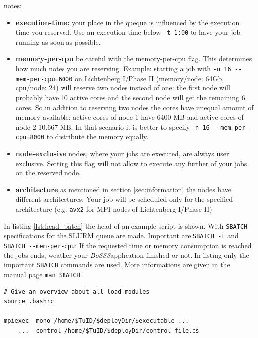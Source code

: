\documentclass[11pt,twoside,a4paper]{fdyartcl}
\newcommand{\Bosss}{\textit{BoSSS}}
\begin{document}
notes:
\begin{itemize}
	\item[] \textbf{execution-time:} your place in the queque is influenced by the execution time you reserved. Use an execution time below \verb|-t 1:00| to have your job running as soon as possible.
	\item[] \textbf{memory-per-cpu} be careful with the memory-per-cpu flag. This determines how much notes you are reserving. Example: starting a job with \verb|-n 16 --mem-per-cpu=6000| on Lichtenberg I/Phase II (memory/node: 64Gb, cpu/node: 24) will reserve two nodes instead of one: the first node will probably have 10 active cores and the second node will get the remaining 6 cores. So in addition to reserving two nodes the cores have unequal amount of memory available: active cores of node 1 have 6400 MB and active cores of node 2 10.667 MB. In that scenario it is better to specify \verb|-n 16 --mem-per-cpu=8000| to distribute the memory equally.
	\item[] \textbf{node-exclusive} nodes, where your jobs are executed, are always user exclusive. Setting this flag will not allow to execute any further of your jobs on the reserved node.
	\item[] \textbf{architecture} as mentioned in section \ref{sec:information} the nodes have different architectures. Your job will be scheduled only for the specified architecture (e.g. \verb|avx2| for MPI-nodes of Lichtenberg I/Phase II)
\end{itemize}


In listing \ref{lst:head_batch} the head of an example script is shown. With \verb|SBATCH| specifications for the SLURM queue are made. Important are \verb|SBATCH -t| and \verb|SBATCH --mem-per-cpu|: If the requested time or memory consumption is reached the jobs ends, weather your \Bosss application finished or not. In listing only the important \verb|SBATCH| commands are used. More informations are given in the manual page \verb|man SBATCH|.

\noindent
\begin{minipage}{\linewidth}
\begin{lstlisting}[caption={Batch-script: body}, 
label={lst:body_batch}]
# Give an overview about all load modules
source .bashrc

mpiexec  mono /home/$TuID/$deployDir/$executable ...
	...--control /home/$TuID/$deployDir/control-file.cs
\end{lstlisting}
\end{minipage}
\end{document}
